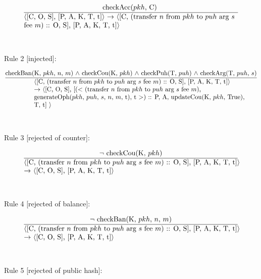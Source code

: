 \documentclass[a4paper]{llncs}
\begin{document}
\begin{equation}{}
\frac{\text{checkAcc($pkh$, C)  }}{\parbox{4.2in}{\text{$\langle$[C, O, S], [P, A, K, T, t]$\rangle$ $\rightarrow$ $\langle$[C, (transfer ${n}$ from ${pkh}$ to  ${puh}$ arg ${s}$ }  \\
\text{fee ${m}$) :: O, S], [P, A, K, T, t]$\rangle$}}} 
\end{equation}
\\
\\
Rule 2 [injected]:

\begin{equation}{}
\frac{\text{checkBan(K, $pkh$, $n$, $m$) $\wedge$ checkCou(K, $pkh$) $\wedge$ checkPuh(T, $puh$)}
\\
\text{ $\wedge$ checkArg(T, $puh$, $s$)}}{\parbox{4.2in}{\text{$\langle$[C, (transfer ${n}$ from ${pkh}$ to  ${puh}$ arg ${s}$ fee ${m}$) :: O, S], [P, A, K, T, t]$\rangle$}\\
\text{$\rightarrow$  $\langle$[C, O, S], [($<$ (transfer ${n}$ from ${pkh}$ to  ${puh}$ arg ${s}$ fee ${m}$), }\\
 \text{generateOph($pkh$, $puh$, $s$, $n$, $m$, t), t $>$) :: P, A, updateCou(K, $pkh$, True), }\\
\text{T, t] $\rangle$}}} 
\end{equation}
\\
\\
Rule 3 [rejected of counter]:

\begin{equation}{}
\frac{\text{$\neg$ checkCou(K, $pkh$)}}{\parbox{4.2in}{\text{$\langle$[C, (transfer ${n}$ from ${pkh}$ to  ${puh}$ arg ${s}$ fee ${m}$) :: O, S], [P, A, K, T, t]$\rangle$  }\\
\text{$\rightarrow$ $\langle$[C, O, S], [P, A, K, T, t]$\rangle$}}} 
\end{equation}
\\
\\
Rule 4 [rejected of balance]:

\begin{equation}{}
\frac{\text{$\neg$ checkBan(K, $pkh$, $n$, $m$)}}{\parbox{4.2in}{\text{$\langle$[C, (transfer ${n}$ from ${pkh}$ to  ${puh}$ arg ${s}$ fee ${m}$) :: O, S], [P, A, K, T, t]$\rangle$ }\\
\text{$\rightarrow$ $\langle$[C, O, S], [P, A, K, T, t]$\rangle$}}} 
\end{equation}
\\
\\
Rule 5 [rejected of public hash]:
\end{document}
